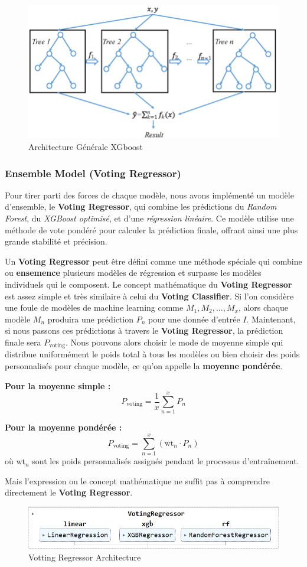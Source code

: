 \begin{figure}[h!]
	\centering
	\includegraphics[width=0.5\linewidth]{images/schema_xgboost}
	\caption{Architecture Générale XGboost}
	\label{fig:schemaxgboost}
\end{figure}


\subsubsection{Ensemble Model (Voting Regressor)}

Pour tirer parti des forces de chaque modèle, nous avons implémenté un modèle d'ensemble, le \textbf{Voting Regressor}, qui combine les prédictions du \textit{Random Forest}, du \textit{XGBoost optimisé}, et d'une \textit{régression linéaire}. Ce modèle utilise une méthode de vote pondéré pour calculer la prédiction finale, offrant ainsi une plus grande stabilité et précision.

Un \textbf{Voting Regressor} peut être défini comme une méthode spéciale qui combine ou \textbf{ensemence} plusieurs modèles de régression et surpasse les modèles individuels qui le composent. Le concept mathématique du \textbf{Voting Regressor} est assez simple et très similaire à celui du \textbf{Voting Classifier}. Si l'on considère une foule de modèles de machine learning comme \(M_1, M_2,\dots , M_x\), alors chaque modèle \(M_n\) produira une prédiction \(P_n\) pour une donnée d'entrée \(I\). Maintenant, si nous passons ces prédictions à travers le \textbf{Voting Regressor}, la prédiction finale sera \(P_{\text{voting}}\). Nous pouvons alors choisir le mode de moyenne simple qui distribue uniformément le poids total à tous les modèles ou bien choisir des poids personnalisés pour chaque modèle, ce qu'on appelle la \textbf{moyenne pondérée}.

\textbf{Pour la moyenne simple :} 
\[
P_{\text{voting}}=\frac{1}{x}\sum_{n=1}^x{P_n}       
\]

\textbf{Pour la moyenne pondérée :} 
\[
P_{\text{voting}}=\sum_{n=1}^x (\text{wt}_{n} \cdot P_n)
\]
où \(\text{wt}_n\) sont les poids personnalisés assignés pendant le processus d'entraînement.

Mais l'expression ou le concept mathématique ne suffit pas à comprendre directement le \textbf{Voting Regressor}.


\begin{figure}[h!]
	\centering
	\includegraphics[width=0.7\linewidth]{images/schema_ensemble}
	\caption{Votting Regressor Architecture}
	\label{fig:schemaensemble}
\end{figure}
